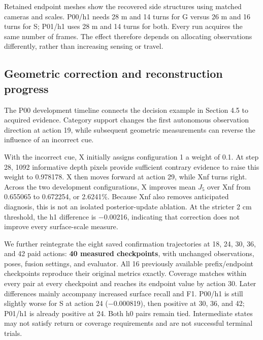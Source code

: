 \documentclass[11pt,a4paper]{article}
\providecommand{\hypertarget}[2]{#2}
\begin{document}
Retained endpoint meshes show the recovered side structures using matched cameras and scales. P00/h1 needs 28 m and 14 turns for G versus 26 m and 16 turns for S; P01/h1 uses 28 m and 14 turns for both. Every run acquires the same number of frames. The effect therefore depends on allocating observations differently, rather than increasing sensing or travel.



\hypertarget{geometric-correction-and-reconstruction-progress}{%
\subsection{Geometric correction and reconstruction progress}\label{geometric-correction-and-reconstruction-progress}}

The P00 development timeline connects the decision example in Section 4.5 to acquired evidence. Category support changes the first autonomous observation direction at action 19, while subsequent geometric measurements can reverse the influence of an incorrect cue.

With the incorrect cue, X initially assigns configuration 1 a weight of 0.1. At step 28, 1092 informative depth pixels provide sufficient contrary evidence to raise this weight to 0.978178. X then moves forward at action 29, while Xnf turns right. Across the two development configurations, X improves mean \(J_5\) over Xnf from 0.655065 to 0.672254, or 2.6241\%. Because Xnf also removes anticipated diagnosis, this is not an isolated posterior-update ablation. At the stricter 2 cm threshold, the h1 difference is \ensuremath{-}0.00216, indicating that correction does not improve every surface-scale measure.



We further reintegrate the eight saved confirmation trajectories at 18, 24, 30, 36, and 42 paid actions: \textbf{40 measured checkpoints}, with unchanged observations, poses, fusion settings, and evaluator. All 16 previously available prefix/endpoint checkpoints reproduce their original metrics exactly. Coverage matches within every pair at every checkpoint and reaches its endpoint value by action 30. Later differences mainly accompany increased surface recall and F1. P00/h1 is still slightly worse for S at action 24 (\ensuremath{-}0.000819), then positive at 30, 36, and 42; P01/h1 is already positive at 24. Both h0 pairs remain tied. Intermediate states may not satisfy return or coverage requirements and are not successful terminal trials.
\end{document}
